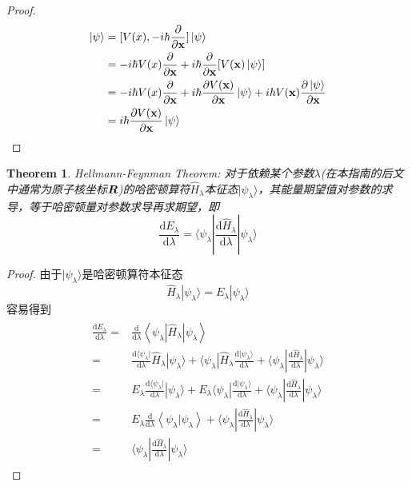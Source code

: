 \documentclass[12pt,a4paper,openany,twoside]{book}
\newtheorem{theorem}{Theorem}[section]
\numberwithin{equation}{section}
\newcommand{\ud}{\mathrm{d}}
\begin{document}
\begin{proof}
          \begin{align*}
            [V(\textbf{x}),\textbf{p}] \ket{\psi} & = [V(x),-i\hbar \frac{\partial}{\partial \textbf{x}}]\ket{\psi}\\
            & = -i\hbar V(x) \frac{\partial }{\partial \textbf{x}} + i\hbar \frac{\partial}{\partial \textbf{x}}[V(\textbf{x})\ket{\psi}]\\
            &= -i\hbar V(x) \frac{\partial }{\partial \textbf{x}}+ i\hbar \frac{\partial V(\textbf{x})}{\partial \textbf{x}}\ket{\psi} +  i\hbar V(\textbf{x}) \frac{\partial \ket{\psi}}{\partial \textbf{x}}\\
            &= i\hbar \frac{\partial V(\textbf{x})}{\partial \textbf{x}} \ket{\psi}
          \end{align*}
        \end{proof}

        \begin{theorem}
          Hellmann-Feynman Theorem:
          对于依赖某个参数$\lambda$(在本指南的后文中通常为原子核坐标$\vb*{R}$)的哈密顿算符$\hat{H}_\lambda$本征态$|\psi_\lambda\rangle$，其能量期望值对参数的求导，等于哈密顿量对参数求导再求期望，即
          \begin{equation}
            \frac{\ud E_\lambda}{\ud \lambda} = \langle\psi_\lambda|\frac{\ud \hat{H}_\lambda}{\ud \lambda}|\psi_\lambda\rangle
          \end{equation}
        \end{theorem}

        \begin{proof}
          由于$|\psi_\lambda\rangle$是哈密顿算符本征态
          \begin{equation*}
            \hat{H}_\lambda|\psi_\lambda\rangle=E_\lambda|\psi_\lambda\rangle
          \end{equation*}  
          容易得到
          \begin{align*}
            \begin{aligned}
              \frac{\ud E_{\lambda}}{\ud \lambda}=&\frac{\ud }{\ud \lambda}\left\langle\psi_{\lambda}\left|\hat{H}_{\lambda}\right| \psi_{\lambda}\right\rangle\\
              =&\frac{\ud \langle\psi_\lambda|}{\ud \lambda}\hat{H}_\lambda|\psi_\lambda\rangle+\langle\psi_\lambda|\hat{H}_\lambda\frac{\ud |\psi_\lambda\rangle}{\ud \lambda}+\langle\psi_\lambda|\frac{\ud \hat{H}_\lambda}{\ud \lambda}|\psi_\lambda\rangle\\
              =&E_\lambda\frac{\ud \langle\psi_\lambda|}{\ud \lambda}|\psi_\lambda\rangle+E_\lambda\langle\psi_\lambda|\frac{\ud |\psi_\lambda\rangle}{\ud \lambda}+\langle\psi_\lambda|\frac{\ud \hat{H}_\lambda}{\ud \lambda}|\psi_\lambda\rangle\\
              =&E_\lambda\frac{\ud }{\ud \lambda}\left\langle\psi_{\lambda} | \psi_{\lambda}\right\rangle+\langle\psi_\lambda|\frac{\ud \hat{H}_\lambda}{\ud \lambda}|\psi_\lambda\rangle\\
              =&\langle\psi_\lambda|\frac{\ud \hat{H}_\lambda}{\ud \lambda}|\psi_\lambda\rangle
            \end{aligned}
          \end{align*}
        \end{proof}
\end{document}
